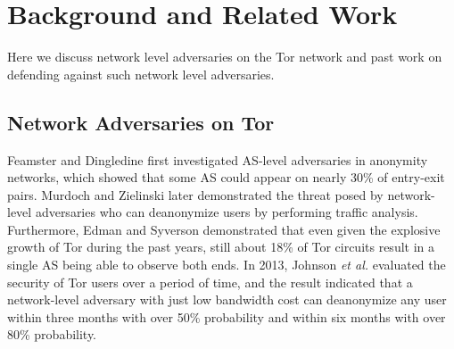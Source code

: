 \section{Background and Related Work}
Here we discuss network level adversaries on the Tor network and past work on defending against such network level adversaries. 

\subsection{Network Adversaries on Tor}
%
Feamster and Dingledine \cite{feamster2004location} first investigated AS-level adversaries in anonymity networks, which showed that some AS could appear on nearly 30\% of entry-exit pairs. Murdoch and Zielinski \cite{murdoch2007sampled} later demonstrated the threat posed by network-level adversaries who can deanonymize users by performing traffic analysis. Furthermore, Edman and Syverson \cite{edman2009awareness} demonstrated that even given the explosive growth of Tor during the past years, still about 18\% of Tor circuits result in a single AS being able to observe both ends. In 2013, Johnson \emph{et al.} \cite{johnson2013users} evaluated the security of Tor users over a period of time, and the result indicated that a network-level adversary with just low bandwidth cost can deanonymize any user within three months with over 50\% probability and within six months with over 80\% probability.

